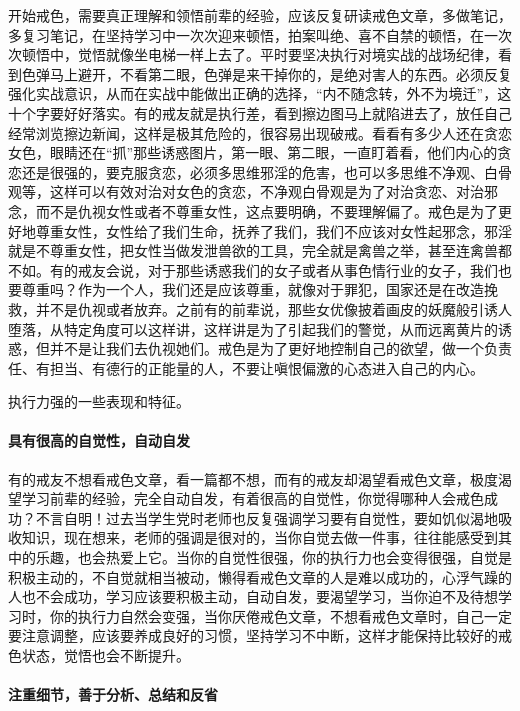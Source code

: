 开始戒色，需要真正理解和领悟前辈的经验，应该反复研读戒色文章，多做笔记，多复习笔记，在坚持学习中一次次迎来顿悟，拍案叫绝、喜不自禁的顿悟，在一次次顿悟中，觉悟就像坐电梯一样上去了。平时要坚决执行对境实战的战场纪律，看到色弹马上避开，不看第二眼，色弹是来干掉你的，是绝对害人的东西。必须反复强化实战意识，从而在实战中能做出正确的选择，“内不随念转，外不为境迁”，这十个字要好好落实。有的戒友就是执行差，看到擦边图马上就陷进去了，放任自己经常浏览擦边新闻，这样是极其危险的，很容易出现破戒。看看有多少人还在贪恋女色，眼睛还在“抓”那些诱惑图片，第一眼、第二眼，一直盯着看，他们内心的贪恋还是很强的，要克服贪恋，必须多思维邪淫的危害，也可以多思维不净观、白骨观等，这样可以有效对治对女色的贪恋，不净观白骨观是为了对治贪恋、对治邪念，而不是仇视女性或者不尊重女性，这点要明确，不要理解偏了。戒色是为了更好地尊重女性，女性给了我们生命，抚养了我们，我们不应该对女性起邪念，邪淫就是不尊重女性，把女性当做发泄兽欲的工具，完全就是禽兽之举，甚至连禽兽都不如。有的戒友会说，对于那些诱惑我们的女子或者从事色情行业的女子，我们也要尊重吗？作为一个人，我们还是应该尊重，就像对于罪犯，国家还是在改造挽救，并不是仇视或者放弃。之前有的前辈说，那些女优像披着画皮的妖魔般引诱人堕落，从特定角度可以这样讲，这样讲是为了引起我们的警觉，从而远离黄片的诱惑，但并不是让我们去仇视她们。戒色是为了更好地控制自己的欲望，做一个负责任、有担当、有德行的正能量的人，不要让嗔恨偏激的心态进入自己的内心。

执行力强的一些表现和特征。

\paragraph{具有很高的自觉性，自动自发}

有的戒友不想看戒色文章，看一篇都不想，而有的戒友却渴望看戒色文章，极度渴望学习前辈的经验，完全自动自发，有着很高的自觉性，你觉得哪种人会戒色成功？不言自明！过去当学生党时老师也反复强调学习要有自觉性，要如饥似渴地吸收知识，现在想来，老师的强调是很对的，当你自觉去做一件事，往往能感受到其中的乐趣，也会热爱上它。当你的自觉性很强，你的执行力也会变得很强，自觉是积极主动的，不自觉就相当被动，懒得看戒色文章的人是难以成功的，心浮气躁的人也不会成功，学习应该要积极主动，自动自发，要渴望学习，当你迫不及待想学习时，你的执行力自然会变强，当你厌倦戒色文章，不想看戒色文章时，自己一定要注意调整，应该要养成良好的习惯，坚持学习不中断，这样才能保持比较好的戒色状态，觉悟也会不断提升。

\paragraph{注重细节，善于分析、总结和反省}

